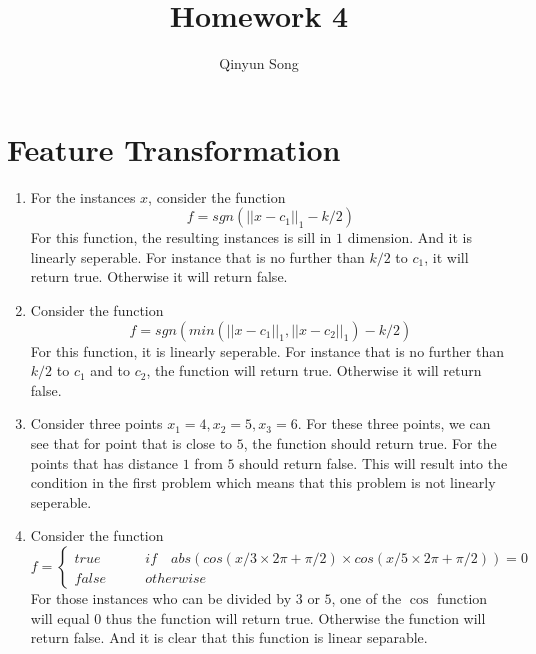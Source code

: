 \documentclass{article}
\title{Homework 4}
\author{Qinyun Song}
\date{}
\begin{document}
	\maketitle
	\section{Feature Transformation}
		\begin{enumerate}
			\item For the instances $x$, consider the function
				\begin{equation}
					f = sgn(||x - c_1||_1 - k / 2)
				\end{equation}
				For this function, the resulting instances is sill in $1$ dimension. And it is linearly seperable. For instance that is no further than $k/2$ to $c_1$, it will return true. Otherwise it will return false.
			\item Consider the function
				\begin{equation}
					f = sgn(min(||x - c_1||_1, ||x - c_2||_1) - k / 2)
				\end{equation}
				For this function, it is linearly seperable. For instance that is no further than $k / 2$ to $c_1$ and to $c_2$, the function will return true. Otherwise it will return false.
			\item Consider three points $x_1 = 4, x_2 = 5, x_3 = 6$. For these three points, we can see that for point that is close to $5$, the function should return true. For the points that has distance $1$ from $5$ should return false. This will result into the condition in the first problem which means that this problem is not linearly seperable.
			\item Consider the function
				\begin{equation}
					f = \left\{
						\begin{aligned} 
							true & \qquad if \quad abs(cos(x / 3 \times 2 \pi + \pi / 2) \times cos(x / 5 \times 2 \pi + \pi / 2)) = 0 \\
							false & \qquad otherwise
						\end{aligned}
					\right.
				\end{equation}
				For those instances who can be divided by $3$ or $5$, one of the $\cos$ function will equal $0$ thus the function will return true. Otherwise the function will return false. And it is clear that this function is linear separable.
		\end{enumerate}
\end{document}
